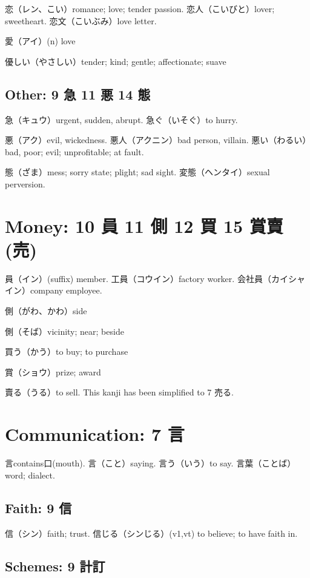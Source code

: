 恋（レン、こい）romance; love; tender passion.
恋人（こいびと）lover; sweetheart.
恋文（こいぶみ）love letter.

愛（アイ）(n) love

優しい（やさしい）tender; kind; gentle; affectionate; suave

\subsection{Other: 9 急 11 悪 14 態}

急（キュウ）urgent, sudden, abrupt.
急ぐ（いそぐ）to hurry.

悪（アク）evil, wickedness.
悪人（アクニン）bad person, villain.
悪い（わるい）bad, poor; evil; unprofitable; at fault.

態（ざま）mess; sorry state; plight; sad sight.
変態（ヘンタイ）sexual perversion.

\section{Money: 10 員 11 側 12 買 15 賞賣(売)}

員（イン）(suffix) member.
工員（コウイン）factory worker.
会社員（カイシャイン）company employee.

側（がわ、かわ）side

側（そば）vicinity; near; beside

買う（かう）to buy; to purchase

賞（ショウ）prize; award

賣る（うる）to sell.
This kanji has been simplified to 7 売る.

\section{Communication: 7 言}

言contains口(mouth).
言（こと）saying.
言う（いう）to say.
言葉（ことば）word; dialect.

\subsection{Faith: 9 信}

信（シン）faith; trust.
信じる（シンじる）(v1,vt) to believe; to have faith in.

\subsection{Schemes: 9 計訂}


